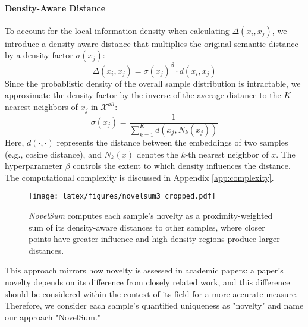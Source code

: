 \paragraph{Density-Aware Distance}
To account for the local information density when calculating \( \Delta(x_i, x_j) \), we introduce a density-aware distance that multiplies the original semantic distance by a density factor \( \sigma(x_j) \):
\begin{equation}
\label{eq:dad}
    \Delta(x_i, x_j) = \sigma(x_j)^{\beta} \cdot d(x_i, x_j)
\end{equation}
Since the probablistic density of the overall sample distribution is intractable, we approximate the density factor by the inverse of the average distance to the \( K \)-nearest neighbors of \( x_j \) in \( \mathcal{X}^{all} \):
\begin{equation*}
    \sigma(x_j) = \frac{1}{\sum_{k=1}^{K} d(x_j, N_k(x_j))}
\end{equation*}
Here, \( d(\cdot, \cdot) \) represents the distance between the embeddings of two samples (e.g., cosine distance), and \( N_k(x) \) denotes the \( k \)-th nearest neighbor of \( x \). The hyperparameter \( \beta \) controls the extent to which density influences the distance. 
The computational complexity is discussed in Appendix \ref{app:complexity}.

\begin{figure}[t!]
    \centering
        \texttt{[image: latex/figures/novelsum3\_cropped.pdf]}
    \caption{\textit{NovelSum} computes each sample's novelty as a proximity-weighted sum of its density-aware distances to other samples, where closer points have greater influence and high-density regions produce larger distances.}
    \label{fig:novelsum}
    \vspace{-2mm}
\end{figure}

This approach mirrors how novelty is assessed in academic papers: a paper's novelty depends on its difference from closely related work, and this difference should be considered within the context of its field for a more accurate measure. Therefore, we consider each sample's quantified uniqueness as "novelty" and name our approach "NovelSum."






